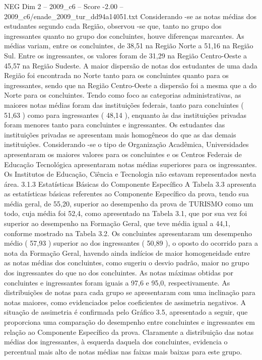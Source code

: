 \begin{textsample}{NEG Dim 2 – 2009\_c6 – Score -2.00 – 2009\_c6/enade\_2009\_tur\_dd94a14051.txt}
Considerando -se as notas médias dos estudantes segundo cada Região, observou -se que, tanto no grupo dos ingressantes quanto no grupo dos concluintes, houve diferenças marcantes.
As médias variam, entre os concluintes, de 38,51 na Região Norte a 51,16 na Região Sul.
Entre os ingressantes, os valores foram de 31,29 na Região Centro-Oeste a 45,57 na Região Sudeste.
A maior dispersão de notas dos estudantes de uma dada Região foi encontrada no Norte tanto para os concluintes quanto para os ingressantes, sendo que na Região Centro-Oeste a dispersão foi a mesma que a do Norte para os concluintes.
Tendo como foco as categorias administrativas, as maiores notas médias foram das instituições federais, tanto para concluintes ( 51,63 ) como para ingressantes ( 48,14 ), enquanto às das instituições privadas foram menores tanto para concluintes e ingressantes.
Os estudantes das instituições privadas se apresentam mais homogêneos do que as das demais instituições.
Considerando -se o tipo de Organização Acadêmica, Universidades apresentaram os maiores valores para os concluintes e os Centros Federais de Educação Tecnológica apresentaram notas médias superiores para os ingressantes.
Os Institutos de Educação, Ciência e Tecnologia não estavam representados nesta área. 3.1.3 Estatísticas Básicas do Componente Específico A Tabela 3.3 apresenta as estatísticas básicas referentes ao Componente Específico da prova, tendo sua média geral, de 55,20, superior ao desempenho da prova de TURISMO como um todo, cuja média foi 52,4, como apresentado na Tabela 3.1, que por sua vez foi superior ao desempenho na Formação Geral, que teve média igual a 44,1, conforme mostrado na Tabela 3.2.
Os concluintes apresentaram um desempenho médio ( 57,93 ) superior ao dos ingressantes ( 50,89 ), o oposto do ocorrido para a nota da Formação Geral, havendo ainda indícios de maior homogeneidade entre as notas médias dos concluintes, como sugeriu o desvio padrão, maior no grupo dos ingressantes do que no dos concluintes.
As notas máximas obtidas por concluintes e ingressantes foram iguais a 97,6 e 95,0, respectivamente.
As distribuições de notas para cada grupo se apresentaram com uma inclinação para notas maiores, como evidenciados pelos coeficientes de assimetria negativos.
A situação de assimetria é confirmada pelo Gráfico 3.5, apresentado a seguir, que proporciona uma comparação do desempenho entre concluintes e ingressantes em relação ao Componente Específico da prova.
Claramente a distribuição das notas médias dos ingressantes, à esquerda daquela dos concluintes, evidencia o percentual mais alto de notas médias nas faixas mais baixas para este grupo.

\end{textsample}
